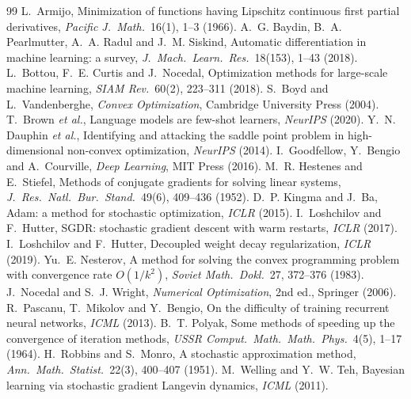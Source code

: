 \documentclass[11pt]{article}
\begin{document}
\begin{thebibliography}{99}\small
{} L.~Armijo, Minimization of functions having Lipschitz continuous first partial derivatives, \emph{Pacific J.\ Math.}\ 16(1), 1--3 (1966).
 A.~G. Baydin, B.~A. Pearlmutter, A.~A. Radul and J.~M. Siskind, Automatic differentiation in machine learning: a survey, \emph{J.\ Mach.\ Learn.\ Res.}\ 18(153), 1--43 (2018).
 L.~Bottou, F.~E. Curtis and J.~Nocedal, Optimization methods for large-scale machine learning, \emph{SIAM Rev.}\ 60(2), 223--311 (2018).
 S.~Boyd and L.~Vandenberghe, \emph{Convex Optimization}, Cambridge University Press (2004).
 T.~Brown \emph{et al.}, Language models are few-shot learners, \emph{NeurIPS} (2020).
 Y.~N. Dauphin \emph{et al.}, Identifying and attacking the saddle point problem in high-dimensional non-convex optimization, \emph{NeurIPS} (2014).
 I.~Goodfellow, Y.~Bengio and A.~Courville, \emph{Deep Learning}, MIT Press (2016).
 M.~R. Hestenes and E.~Stiefel, Methods of conjugate gradients for solving linear systems, \emph{J.\ Res.\ Natl.\ Bur.\ Stand.}\ 49(6), 409--436 (1952).
 D.~P. Kingma and J.~Ba, Adam: a method for stochastic optimization, \emph{ICLR} (2015).
 I.~Loshchilov and F.~Hutter, SGDR: stochastic gradient descent with warm restarts, \emph{ICLR} (2017).
 I.~Loshchilov and F.~Hutter, Decoupled weight decay regularization, \emph{ICLR} (2019).
 Yu.~E. Nesterov, A method for solving the convex programming problem with convergence rate $O(1/k^2)$, \emph{Soviet Math.\ Dokl.}\ 27, 372--376 (1983).
 J.~Nocedal and S.~J. Wright, \emph{Numerical Optimization}, 2nd ed., Springer (2006).
 R.~Pascanu, T.~Mikolov and Y.~Bengio, On the difficulty of training recurrent neural networks, \emph{ICML} (2013).
 B.~T. Polyak, Some methods of speeding up the convergence of iteration methods, \emph{USSR Comput.\ Math.\ Math.\ Phys.}\ 4(5), 1--17 (1964).
 H.~Robbins and S.~Monro, A stochastic approximation method, \emph{Ann.\ Math.\ Statist.}\ 22(3), 400--407 (1951).
 M.~Welling and Y.~W. Teh, Bayesian learning via stochastic gradient Langevin dynamics, \emph{ICML} (2011).
\end{thebibliography}

\SourceNote
\end{document}
